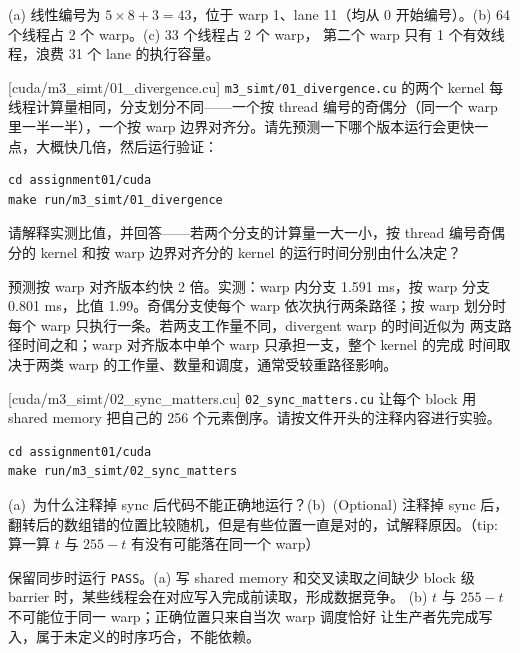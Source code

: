 \documentclass[11pt,a4paper,fontset=fandol]{ctexart}
\begin{document}
\begin{answer}
(a) 线性编号为 $5\times 8+3=43$，位于 warp 1、lane 11（均从 0
开始编号）。(b) 64 个线程占 2 个 warp。(c) 33 个线程占 2 个 warp，
第二个 warp 只有 1 个有效线程，浪费 31 个 lane 的执行容量。
\end{answer}

[cuda/m3\_simt/01\_divergence.cu]
\texttt{m3\_simt/01\_divergence.cu} 的两个 kernel 每线程计算量相同，分支划分不同——一个按 thread 编号的奇偶分（同一个 warp 里一半一半），一个按 warp 边界对齐分。请先预测一下哪个版本运行会更快一点，大概快几倍，然后运行验证：

\begin{lstlisting}
cd assignment01/cuda
make run/m3_simt/01_divergence
\end{lstlisting}

请解释实测比值，并回答——若两个分支的计算量一大一小，按 thread 编号奇偶分的 kernel 和按 warp 边界对齐分的 kernel 的运行时间分别由什么决定？

\begin{answer}
预测按 warp 对齐版本约快 2 倍。实测：warp 内分支 1.591 ms，按 warp
分支 0.801 ms，比值 1.99。奇偶分支使每个 warp 依次执行两条路径；按 warp
划分时每个 warp 只执行一条。若两支工作量不同，divergent warp 的时间近似为
两支路径时间之和；warp 对齐版本中单个 warp 只承担一支，整个 kernel 的完成
时间取决于两类 warp 的工作量、数量和调度，通常受较重路径影响。
\end{answer}

[cuda/m3\_simt/02\_sync\_matters.cu]
\texttt{02\_sync\_matters.cu} 让每个 block 用 shared memory 把自己的 256 个元素倒序。请按文件开头的注释内容进行实验。

\begin{lstlisting}
cd assignment01/cuda
make run/m3_simt/02_sync_matters
\end{lstlisting}

(a)~为什么注释掉 sync 后代码不能正确地运行？(b)~(Optional) 注释掉 sync 后，翻转后的数组错的位置比较随机，但是有些位置一直是对的，试解释原因。（tip: 算一算 $t$ 与 $255-t$ 有没有可能落在同一个 warp）

\begin{answer}
保留同步时运行 \texttt{PASS}。(a) 写 shared memory 和交叉读取之间缺少
block 级 barrier 时，某些线程会在对应写入完成前读取，形成数据竞争。
(b) $t$ 与 $255-t$ 不可能位于同一 warp；正确位置只来自当次 warp 调度恰好
让生产者先完成写入，属于未定义的时序巧合，不能依赖。
\end{answer}
\end{document}
